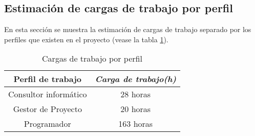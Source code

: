 \subsection{Estimación de cargas de trabajo por perfil}

En esta sección se muestra la estimación de cargas de trabajo separado por los perfiles que existen en el proyecto (vease la tabla \ref{tab:workload}).

\begin{table}[htp]
	\centering
	\caption{Cargas de trabajo por perfil}\label{tab:workload}
	\begin{tabular}{cc}
		\toprule
    	\textbf{Perfil de trabajo} & \emph{Carga de trabajo(h)}\\
    	\midrule
		Consultor informático	&	28 horas\\
		Gestor de Proyecto		&	20 horas\\
		Programador				&	163 horas\\
    	\bottomrule
    \end{tabular}
\end{table}